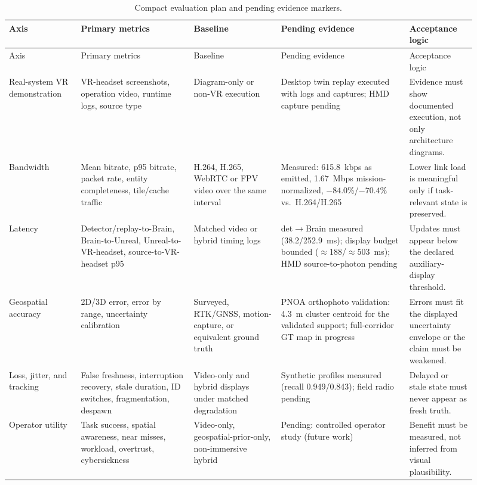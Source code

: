 \documentclass[fleqn]{VRIH2025}
\begin{document}
\begingroup
\scriptsize
\setlength{\tabcolsep}{2pt}
\begin{longtable}{@{}L{0.14\linewidth}L{0.22\linewidth}L{0.17\linewidth}L{0.25\linewidth}L{0.13\linewidth}@{}}
\caption{Compact evaluation plan and pending evidence markers.}
\label{tab:evaluation-compact}\\
\toprule
Axis & Primary metrics & Baseline & Pending evidence & Acceptance logic \\
\midrule
\endfirsthead
\toprule
Axis & Primary metrics & Baseline & Pending evidence & Acceptance logic \\
\midrule
\endhead
Real-system VR demonstration & VR-headset screenshots, operation video, runtime logs, source type & Diagram-only or non-VR execution & Desktop twin replay executed with logs and captures; HMD capture pending & Evidence must show documented execution, not only architecture diagrams. \\
Bandwidth & Mean bitrate, p95 bitrate, packet rate, entity completeness, tile/cache traffic & H.264, H.265, WebRTC or FPV video over the same interval & Measured: 615.8~kbps as emitted, 1.67~Mbps mission-normalized, $-84.0$\%/$-70.4$\% vs.\ H.264/H.265 & Lower link load is meaningful only if task-relevant state is preserved. \\
Latency & Detector/replay-to-Brain, Brain-to-Unreal, Unreal-to-VR-headset, source-to-VR-headset p95 & Matched video or hybrid timing logs & det$\to$Brain measured (38.2/252.9~ms); display budget bounded ($\approx$188/$\approx$503~ms); HMD source-to-photon pending & Updates must appear below the declared auxiliary-display threshold. \\
Geospatial accuracy & 2D/3D error, error by range, uncertainty calibration & Surveyed, RTK/GNSS, motion-capture, or equivalent ground truth & PNOA orthophoto validation: 4.3~m cluster centroid for the validated support; full-corridor GT map in progress & Errors must fit the displayed uncertainty envelope or the claim must be weakened. \\
Loss, jitter, and tracking & False freshness, interruption recovery, stale duration, ID switches, fragmentation, despawn & Video-only and hybrid displays under matched degradation & Synthetic profiles measured (recall 0.949/0.843); field radio pending & Delayed or stale state must never appear as fresh truth. \\
Operator utility & Task success, spatial awareness, near misses, workload, overtrust, cybersickness & Video-only, geospatial-prior-only, non-immersive hybrid & Pending: controlled operator study (future work) & Benefit must be measured, not inferred from visual plausibility. \\

\end{longtable}
\end{document}
